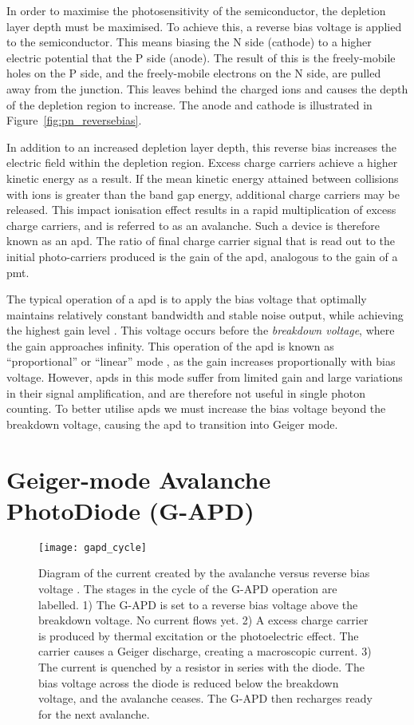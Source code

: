 In order to maximise the photosensitivity of the semiconductor, the depletion layer depth must be maximised. To achieve this, a reverse bias voltage is applied to the semiconductor. This means biasing the N side (cathode) to a higher electric potential that the P side (anode). The result of this is the freely-mobile holes on the P side, and the freely-mobile electrons on the N side, are pulled away from the junction. This leaves behind the charged ions and causes the depth of the depletion region to increase. The anode and cathode is illustrated in Figure~\ref{fig:pn_reversebias}.

In addition to an increased depletion layer depth, this reverse bias increases the electric field within the depletion region. Excess charge carriers achieve a higher kinetic energy as a result. If the mean kinetic energy attained between collisions with ions is greater than the band gap energy, additional charge carriers may be released. This impact ionisation effect results in a rapid multiplication of excess charge carriers, and is referred to as an avalanche. Such a device is therefore known as an \gls{apd}. The ratio of final charge carrier signal that is read out to the initial photo-carriers produced is the gain of the \gls{apd}, analogous to the gain of a \gls{pmt}.

The typical operation of a \gls{apd} is to apply the bias voltage that optimally maintains relatively constant bandwidth and stable noise output, while achieving the highest gain level \cite{Ghassemi2017}. This voltage occurs before the \textit{breakdown voltage}, where the gain approaches infinity. This operation of the \gls{apd} is known as ``proportional'' or ``linear'' mode \cite{Otte2006}, as the gain increases proportionally with bias voltage. However, \glspl{apd} in this mode suffer from limited gain and large variations in their signal amplification, and are therefore not useful in single photon counting. To better utilise \glspl{apd} we must increase the bias voltage beyond the breakdown voltage, causing the \gls{apd} to transition into Geiger mode.

\section{Geiger-mode Avalanche PhotoDiode (G-APD)}

\begin{figure}
	\centering
    \texttt{[image: gapd\_cycle]} 
	\caption[G-APD reverse bias voltage cycle.]{Diagram of the current created by the avalanche versus reverse bias voltage \cite{SensL2011}. The stages in the cycle of the G-APD operation are labelled. 1) The G-APD is set to a reverse bias voltage above the breakdown voltage. No current flows yet. 2) A excess charge carrier is produced by thermal excitation or the photoelectric effect. The carrier causes a Geiger discharge, creating a macroscopic current. 3) The current is quenched by a resistor in series with the diode. The bias voltage across the diode is reduced below the breakdown voltage, and the avalanche ceases. The G-APD then recharges ready for the next avalanche.}
	\label{fig:gapd_cycle}
\end{figure}

